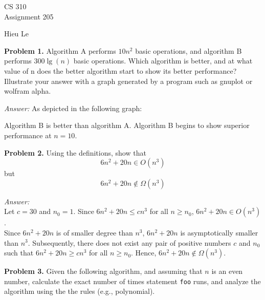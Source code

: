 \documentclass[12pt]{article}
\begin{document}
\thispagestyle{empty}

\begin{center}
{\large CS 310}\\
Assignment 205
\end{center}

\begin{flushright}
Hieu Le
\end{flushright}

\textbf{Problem 1.} Algorithm A performs $10n^2$ basic operations, and
algorithm B performs $300\lg(n)$ basic operations. Which algorithm is
better, and at what value of n does the better algorithm start to show
its better performance? Illustrate your answer with a graph generated
by a program such as gnuplot or wolfram alpha.

\textit{Answer:} As depicted in the following graph:

\begin{center}
\end{center}

Algorithm B is better than algorithm A. Algorithm B begins to show superior performance at $n = 10$.

\textbf{Problem 2.} Using the definitions,
show that
\[
6n^2 + 20n \in O(n^3)
\]
but
\[
6n^2 + 20n \not\in \Omega(n^3)
\]

\textit{Answer:} \\
Let $c = 30$ and $n_0 = 1$. Since $6n^2 + 20n \leq cn^3$ for all $n \geq n_0$, $6n^2 + 20n \in O(n^3)$.\\
Since $6n^2 + 20n$ is of smaller degree than $n^3$, $6n^2 + 20n$ is asymptotically smaller than $n^3$. Subsequently, there does not exist any pair of positive numbers $c$ and $n_0$ such that $6n^2 + 20n \geq cn^3$ for all $n \geq n_0$. Hence, $6n^2 + 20n \not\in \Omega(n^3)$.

\textbf{Problem 3.} Given the following algorithm, and assuming that $n$ is an even
        number, calculate the exact number of times
            statement \texttt{foo} runs, and analyze the algorithm
            using the the rules (e.g., polynomial).
\end{document}

